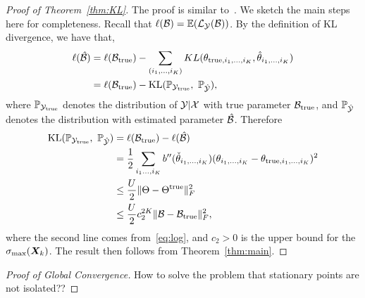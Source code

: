 \documentclass[11pt]{article}
\theoremstyle{plain}
\theoremstyle{definition}
\begin{document}
\begin{proof}[Proof of Theorem~\ref{thm:KL}]
The proof is similar to~\cite{baldin2018optimal}. We sketch the main steps here for completeness. Recall that $\ell(\mathcal{B})=\mathbb{E}(\mathcal{L}_{\mathcal{Y}}(\mathcal{B}))$. By the definition of KL divergence, we have that,
\begin{align}
\ell(\hat \tB)&=\ell(\trueB)-\sum_{(i_1,\ldots,i_K)} KL(\theta_{\text{true}, i_1,\ldots, i_K}, \hat \theta_{i_1,\ldots,i_K})\\
&=\ell(\trueB)-\text{KL}(\mathbb{P}_{\tY_{\text{true}}},\ \mathbb{P}_{\hat \tY}),
\end{align}
where $\mathbb{P}_{\mathcal{Y}_{\text{true}}}$ denotes the distribution of $\mathcal{Y}|\mathcal{X}$ with true parameter $\mathcal{B}_{\text{true}}$, and $\mathbb{P}_{\hat {\mathcal{Y}}}$ denotes the distribution with estimated parameter $\hat {\mathcal{B}}$. Therefore
\begin{align}
\text{KL}(\mathbb{P}_{\mathcal{Y}_{\text{true}}},\ \mathbb{P}_{\hat {\mathcal{Y}}}) &= \ell(\mathcal{B}_{\text{true}})-\ell(\hat {\mathcal{B}})\\
&={1\over 2}\sum_{i_1\ldots,i_K}b''(\check \theta_{i_1,\ldots,i_K})(\theta_{i_1,\ldots,i_K}-\theta_{\text{true},i_1,\ldots,i_K})^2\\
&\leq {U\over 2} \lVert\Theta-\Theta^{\text{true}}\rVert_F^2\\
&\leq {U \over 2}c^{2K}_2\lVert\mathcal{B}-\mathcal{B}_{\text{true}}\rVert_F^2,
\end{align}
where the second line comes from~\eqref{eq:log}, and $c_2>0$ is the upper bound for the $\sigma_{\max}(\bm X_k)$. The result then follows from Theorem~\ref{thm:main}.
\end{proof}

\begin{proof}[Proof of Global Convergence]
How to solve the problem that stationary points are not isolated?? 

\end{proof}
\end{document}
